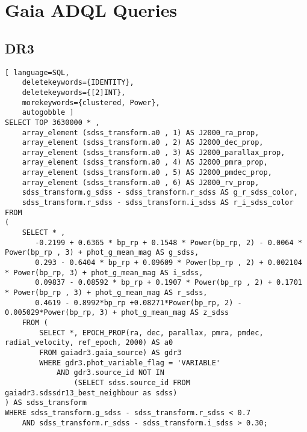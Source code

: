 \chapter{Gaia ADQL Queries} \label{apendice:gaiaAdql}

\section{DR3} \label{apendice:gaiaAdql:dr3}
\begin{lstlisting}[ language=SQL,
	deletekeywords={IDENTITY},
	deletekeywords={[2]INT},
	morekeywords={clustered, Power},
	autogobble ]
SELECT TOP 3630000 * ,
	array_element (sdss_transform.a0 , 1) AS J2000_ra_prop,
	array_element (sdss_transform.a0 , 2) AS J2000_dec_prop,
	array_element (sdss_transform.a0 , 3) AS J2000_parallax_prop,
	array_element (sdss_transform.a0 , 4) AS J2000_pmra_prop,
	array_element (sdss_transform.a0 , 5) AS J2000_pmdec_prop,
	array_element (sdss_transform.a0 , 6) AS J2000_rv_prop,
	sdss_transform.g_sdss - sdss_transform.r_sdss AS g_r_sdss_color,
	sdss_transform.r_sdss - sdss_transform.i_sdss AS r_i_sdss_color
FROM
(
	SELECT * ,
	   -0.2199 + 0.6365 * bp_rp + 0.1548 * Power(bp_rp, 2) - 0.0064 * Power(bp_rp , 3) + phot_g_mean_mag AS g_sdss,
	   0.293 - 0.6404 * bp_rp + 0.09609 * Power(bp_rp , 2) + 0.002104 * Power(bp_rp, 3) + phot_g_mean_mag AS i_sdss,
	   0.09837 - 0.08592 * bp_rp + 0.1907 * Power(bp_rp , 2) + 0.1701 * Power(bp_rp , 3) + phot_g_mean_mag AS r_sdss,
	   0.4619 - 0.8992*bp_rp +0.08271*Power(bp_rp, 2) - 0.005029*Power(bp_rp, 3) + phot_g_mean_mag AS z_sdss
	FROM (
		SELECT *, EPOCH_PROP(ra, dec, parallax, pmra, pmdec, radial_velocity, ref_epoch, 2000) AS a0
		FROM gaiadr3.gaia_source) AS gdr3
		WHERE gdr3.phot_variable_flag = 'VARIABLE'
			AND gdr3.source_id NOT IN
				(SELECT sdss.source_id FROM gaiadr3.sdssdr13_best_neighbour as sdss)
) AS sdss_transform
WHERE sdss_transform.g_sdss - sdss_transform.r_sdss < 0.7
	AND sdss_transform.r_sdss - sdss_transform.i_sdss > 0.30;

\end{lstlisting}
